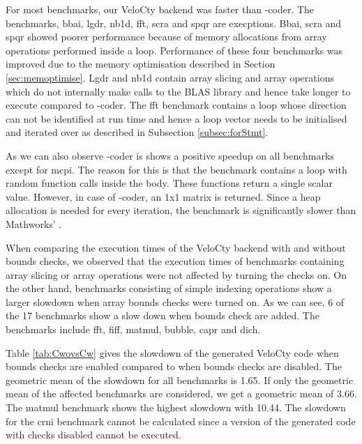 For most benchmarks, our VeloCty backend was faster than \matlab-coder. The benchmarks, bbai, lgdr, nb1d, fft, scra and spqr are execptions. Bbai, scra and spqr showed poorer performance because of memory allocations from array operations performed inside a loop. Performance of these four benchmarks was improved due to the memory optimisation described in Section \ref{sec:memoptimise}. Lgdr and nb1d contain array slicing and array operations which do not internally make calls to the BLAS library and hence take longer to execute compared to \matlab-coder. The fft benchmark contains a loop whose direction can not be identified at run time and hence a loop vector needs to be initialised and iterated over as described in Subsection \ref{subsec:forStmt}. 

As we can also observe \matlab-coder is shows a positive speedup on all benchmarks except for mcpi. The reason for this is that the benchmark contains a loop with random function calls inside the body. These functions return a single scalar value. However, in case of \matlab-coder, an 1x1 matrix is returned. Since a heap allocation is needed for every iteration, the benchmark is significantly slower than Mathworks' \matlab. 

When comparing the execution times of the VeloCty backend with and without bounds checks, we observed that the execution times of benchmarks containing array slicing or array operations were not affected by turning the checks on. On the other hand, benchmarks consisting of simple indexing operations show a larger slowdown when array bounds checks were turned on. As we can see, 6 of the 17 benchmarks show a slow down when bounds check are added. The benchmarks include fft, fiff, matmul, bubble, capr and dich. 

Table \ref{tab:CwovsCw} gives the slowdown of the generated VeloCty code when bounds checks are enabled compared to when bounds checks are disabled. The geometric mean of the slowdown for all benchmarks is 1.65. If only the geometric mean of the affected benchmarks are considered, we get a geometric mean of 3.66. The matmul benchmark shows the highest slowdown with 10.44. The slowdown for the crni benchmark cannot be calculated since a version of the generated code with checks disabled cannot be executed. 

